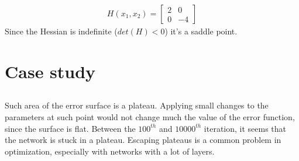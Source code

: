 \documentclass[12pt]{article}
\begin{document}
\begin{align}
H(x_1,x_2) = \begin{bmatrix}
2 & 0 \\
0 & -4
\end{bmatrix}
\end{align}
Since the Hessian is indefinite ($det(H) <0$) it's a saddle point.

\section{Case study}
\subsection{}
Such area of the error surface is a plateau. Applying small changes to the parameters at such point would not change much the value of the error function, since the surface is flat.
Between the $100^{th}$ and $10000^{th}$ iteration, it seems that the network is stuck in a plateau. Escaping plateaus is a common problem in optimization, especially with networks with a lot of layers.
\subsection{}
\end{document}
